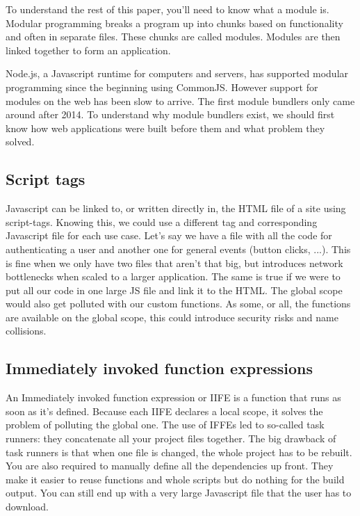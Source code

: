 To understand the rest of this paper, you’ll need to know what a module is. Modular programming breaks a program up into chunks based on functionality and often in separate files. These chunks are called modules. Modules are then linked together to form an application. 

Node.js, a Javascript runtime for computers and servers, has supported modular programming since the beginning using CommonJS. However support for modules on the web has been slow to arrive. The first module bundlers only came around after 2014. To understand why module bundlers exist, we should first know how web applications were built before them and what problem they solved.

\subsection{Script tags}

Javascript can be linked to, or written directly in, the HTML file of a site using script-tags. Knowing this, we could use a different tag and corresponding Javascript file for each use case. Let’s say we have a file with all the code for authenticating a user and another one for general events (button clicks, ...). This is fine when we only have two files that aren’t that big, but introduces network bottlenecks when scaled to a larger application. The same is true if we were to put all our code in one large JS file and link it to the HTML. The global scope would also get polluted with our custom functions. As some, or all, the functions are available on the global scope, this could introduce security risks and name collisions. 



\subsection{Immediately invoked function expressions}

An Immediately invoked function expression or IIFE is a function that runs as soon as it’s defined. Because each IIFE declares a local scope, it solves the problem of polluting the global one. The use of IFFEs led to so-called task runners: they concatenate all your project files together. The big drawback of task runners is that when one file is changed, the whole project has to be rebuilt. You are also required to manually define all the dependencies up front. They make it easier to reuse functions and whole scripts but do nothing for the build output. You can still end up with a very large Javascript file that the user has to download. \\ \\ \\

